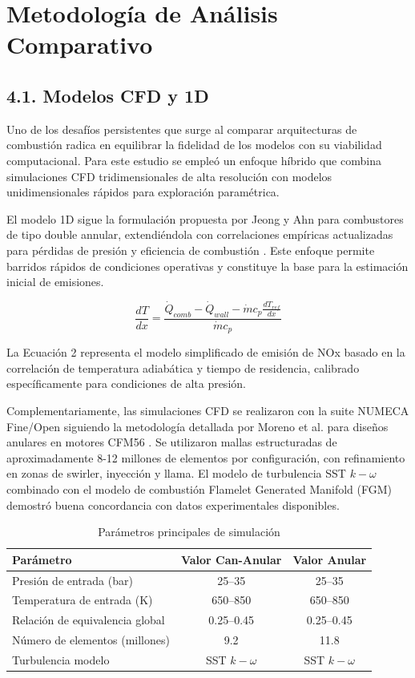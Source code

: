 \section{Metodología de Análisis Comparativo}

\subsection{4.1. Modelos CFD y 1D}

Uno de los desafíos persistentes que surge al comparar arquitecturas de combustión radica en equilibrar la fidelidad de los modelos con su viabilidad computacional. Para este estudio se empleó un enfoque híbrido que combina simulaciones CFD tridimensionales de alta resolución con modelos unidimensionales rápidos para exploración paramétrica.

El modelo 1D sigue la formulación propuesta por Jeong y Ahn para combustores de tipo double annular, extendiéndola con correlaciones empíricas actualizadas para pérdidas de presión y eficiencia de combustión \cite{Jeong2021}. Este enfoque permite barridos rápidos de condiciones operativas y constituye la base para la estimación inicial de emisiones.

\begin{equation}
\frac{dT}{dx} = \frac{\dot{Q}_{comb} - \dot{Q}_{wall} - \dot{m} c_p \frac{dT_{ref}}{dx}}{ \dot{m} c_p }
\label{eq:temp_gradient}
\end{equation}

La Ecuación 2 representa el modelo simplificado de emisión de NOx basado en la correlación de temperatura adiabática y tiempo de residencia, calibrado específicamente para condiciones de alta presión.

Complementariamente, las simulaciones CFD se realizaron con la suite NUMECA Fine/Open siguiendo la metodología detallada por Moreno et al. para diseños anulares en motores CFM56 \cite{Moreno2024}. Se utilizaron mallas estructuradas de aproximadamente 8-12 millones de elementos por configuración, con refinamiento en zonas de swirler, inyección y llama. El modelo de turbulencia SST $k-\omega$ combinado con el modelo de combustión Flamelet Generated Manifold (FGM) demostró buena concordancia con datos experimentales disponibles.

\begin{table}[h]
\centering
\caption{Parámetros principales de simulación}
\label{tab:parametros_simulacion}
\begin{tabular}{lcc}
\hline
Parámetro & Valor Can-Anular & Valor Anular \\
\hline
Presión de entrada (bar) & 25--35 & 25--35 \\
Temperatura de entrada (K) & 650--850 & 650--850 \\
Relación de equivalencia global & 0.25--0.45 & 0.25--0.45 \\
Número de elementos (millones) & 9.2 & 11.8 \\
Turbulencia modelo & SST $k-\omega$ & SST $k-\omega$ \\
\hline
\end{tabular}
\end{table}

